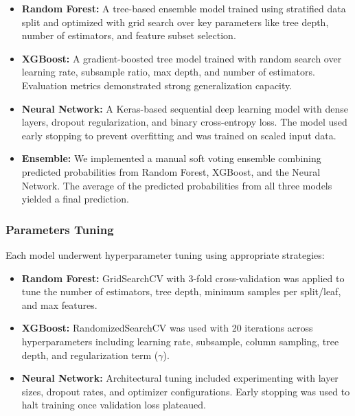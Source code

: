 \documentclass{article} %
\begin{document}
\begin{itemize}
    \item \textbf{Random Forest:} A tree-based ensemble model trained using stratified data split and optimized with grid search over key parameters like tree depth, number of estimators, and feature subset selection.
    
    \item \textbf{XGBoost:} A gradient-boosted tree model trained with random search over learning rate, subsample ratio, max depth, and number of estimators. Evaluation metrics demonstrated strong generalization capacity.
    
    \item \textbf{Neural Network:} A Keras-based sequential deep learning model with dense layers, dropout regularization, and binary cross-entropy loss. The model used early stopping to prevent overfitting and was trained on scaled input data.

    \item \textbf{Ensemble:} We implemented a manual soft voting ensemble combining predicted probabilities from Random Forest, XGBoost, and the Neural Network. The average of the predicted probabilities from all three models yielded a final prediction.
\end{itemize}

\subsubsection*{Parameters Tuning}

Each model underwent hyperparameter tuning using appropriate strategies:

\begin{itemize}
    \item \textbf{Random Forest:} GridSearchCV with 3-fold cross-validation was applied to tune the number of estimators, tree depth, minimum samples per split/leaf, and max features.
    \item \textbf{XGBoost:} RandomizedSearchCV was used with 20 iterations across hyperparameters including learning rate, subsample, column sampling, tree depth, and regularization term ($\gamma$).
    \item \textbf{Neural Network:} Architectural tuning included experimenting with layer sizes, dropout rates, and optimizer configurations. Early stopping was used to halt training once validation loss plateaued.
\end{itemize}
\end{document}
